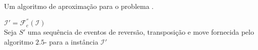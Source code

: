 \begin{algorithm}[!tbh]
  \caption{Um algoritmo de aproximação para o problema \SbFIRTM{}.\label{algorithm:XXIGKPAV}}
  $\mathcal{I}' = \mathcal{F}_{c}^{''}(\mathcal{I})$ \\
  Seja $S'$ uma sequência de eventos de reversão, transposição e move fornecida pelo algoritmo $2.5$-\SbIRTM{} para a instância $\mathcal{I}'$ \\
\end{algorithm}
